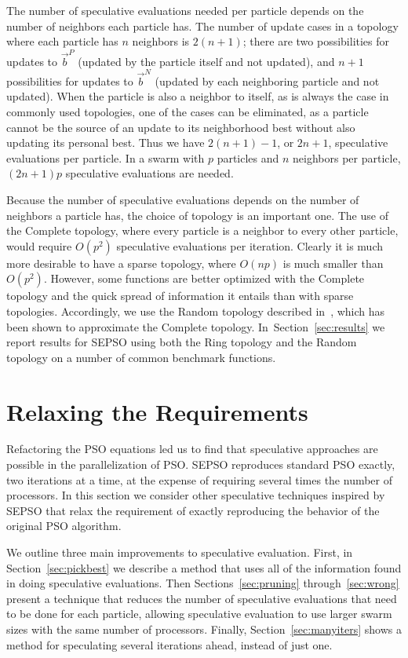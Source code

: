 \documentclass[smallcondensed]{svjour3}
\renewcommand{\sec}[1]{Section~\ref{sec:#1}}
\providecommand{\pers}{\ensuremath{P}}
\providecommand{\neigh}{\ensuremath{N}}
\providecommand{\nbest}{\ensuremath{\Vec{b}^\neigh}}
\providecommand{\pbest}{\ensuremath{\Vec{b}^\pers}}
\begin{document}
The number of speculative evaluations needed per particle depends on the number
of neighbors each particle has.  The number of update cases in a topology where
each particle has $n$ neighbors is $2(n+1)$; there are two possibilities for
updates to $\pbest$ (updated by the particle itself and not updated), and $n+1$
possibilities for updates to $\nbest$ (updated by each neighboring particle and
not updated).  When the particle is also a neighbor to itself, as is always the
case in commonly used topologies, one of the cases can be eliminated, as a
particle cannot be the source of an update to its neighborhood best without
also updating its personal best.  Thus we have $2(n+1)-1$, or $2n+1$,
speculative evaluations per particle.  In a swarm with $p$ particles and $n$
neighbors per particle, $(2n+1)p$ speculative evaluations are needed.

Because the number of speculative evaluations depends on the number of
neighbors a particle has, the choice of topology is an important one.  The use
of the Complete topology, where every particle is a neighbor to every other
particle, would require $O(p^2)$ speculative evaluations per iteration.
Clearly it is much more desirable to have a sparse topology, where $O(np)$ is
much smaller than $O(p^2)$.  However, some functions are better optimized with
the Complete topology and the quick spread of information it entails than with
sparse topologies.  Accordingly, we use the Random topology described
in~\citep{mcnabb-2009-large-particle-swarms}, which has been shown to
approximate the Complete topology.  In~\sec{results} we report results for
SEPSO using both the Ring topology and the Random topology on a number of
common benchmark functions.

\section{Relaxing the Requirements}
\label{sec:relax}

Refactoring the PSO equations led us to find that speculative approaches are
possible in the parallelization of PSO.  SEPSO reproduces standard PSO exactly,
two iterations at a time, at the expense of requiring several times the number
of processors.  In this section we consider other speculative techniques
inspired by SEPSO that relax the requirement of exactly reproducing the
behavior of the original PSO algorithm.

We outline three main improvements to speculative evaluation.  First, in
\sec{pickbest} we describe a method that uses all of the information found in
doing speculative evaluations.  Then Sections~\ref{sec:pruning}
through~\ref{sec:wrong} present a technique that reduces the number of
speculative evaluations that need to be done for each particle, allowing
speculative evaluation to use larger swarm sizes with the same number of
processors.  Finally, \sec{manyiters} shows a method for speculating several
iterations ahead, instead of just one.
\end{document}
